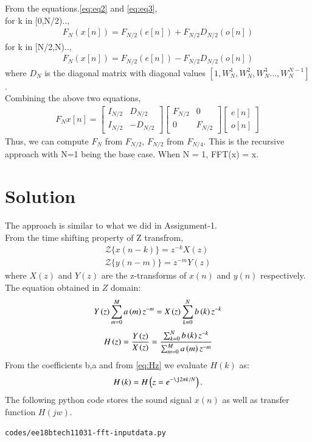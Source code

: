 \documentclass[journal,12pt,twocolumn]{IEEEtran}
\begin{document}
From the equations.\eqref{eq:eq2} and \eqref{eq:eq3},\\ for k in [0,N/2)..,
\begin{align}
    F_N (x[n]) = F_{N/2} (e[n]) +F_{N/2}D_{N/2} (o[n])
\end{align}
for k in [N/2,N)..,
\begin{align}
    F_N(x[n]) = F_{N/2}(e[n]) -F_{N/2}D_{N/2}(o[n])
\end{align}
where $D_N$ is the diagonal matrix with diagonal values $[1,W_N^1,W_N^2,W_N^3...,W_N^{N-1}]$.\\
Combining the above two equations, 
\begin{align}
    F_N x[n] = \begin{bmatrix}I_{N/2} & D_{N/2} \\ I_{N/2} & -D_{N/2} 
    \end{bmatrix} \begin{bmatrix}F_{N/2} & 0 \\ 0 & F_{N/2} 
    \end{bmatrix} \begin{bmatrix}e[n]\\ o[n] \label{eq:eq4}
    \end{bmatrix}
\end{align}
Thus, we can compute $F_N$ from $F_{N/2}$, $F_{N/2}$ from $F_{N/4}$. This is the recursive approach with N=1 being the base case. 
When N = 1, FFT(x) = x.


\section{Solution}
The approach is similar to what we did in Assignment-1.\\
From the time shifting property of Z transfrom, 
  \begin{align}
      {\mathcal {Z}}\{x(n-k)\} = z^{-k}X(z) \\
      {\mathcal {Z}}\{y(n-m)\} = z^{-m}Y(z)
  \end{align}
  where $X(z)$ and $Y(z)$ are the z-transforms of $x(n)$ and $y(n)$ respectively.
\newline
The equation obtained in $Z$ domain:
\begin{align}
     Y\left(z\right) \sum _{m=0}^{M}a\left(m\right) z^{-m} = X\left(z\right) \sum _{k=0}^{N}b\left(k\right)z^{-k}
\end{align}
\begin{align}
\label{eq:Hz}
    H\brak{z} = \frac{Y\brak{z}}{X\brak{z}} = \frac{\sum _{k=0}^{N}b\brak{k} z^{-k}}{\sum _{m=0}^{M}a\brak{m}z^{-m}}
\end{align}    
From the coefficients b,a and from \eqref{eq:Hz} we evaluate $H(k)$ as:
\begin{equation}
H\brak{k} = H\brak{z = e^{-\j 2 \pi k/N}}.
\end{equation}
The following python code stores the sound signal $x(n)$ as well as transfer function $H(jw)$.
\begin{lstlisting}
codes/ee18btech11031-fft-inputdata.py
\end{lstlisting}
\end{document}
